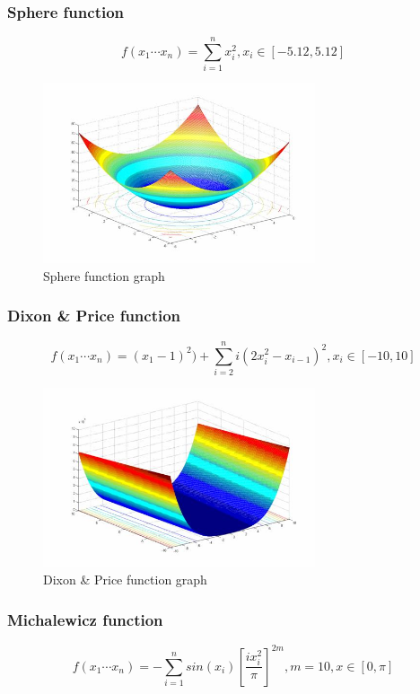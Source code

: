 \documentclass{article}
\begin{document}
	\subsubsection{Sphere function}
	$$f(x_1 \cdots x_n) = {\sum_{i=1}^{n} x_i^{2}}, x_i \in [-5.12, 5.12]$$

	\begin{figure}[!h]
		\includegraphics[height=150pt,keepaspectratio]{images/sphere-graph.jpg}
		\caption{Sphere function graph}
	\end{figure}

    
	\subsubsection{Dixon \& Price function}
	$$f(x_1 \cdots x_n) = (x_1 - 1)^2 ) + {\sum_{i=2}^{n} i(2x_i^{2} - x_{i-1})^2}, x_i \in [-10, 10]$$


	\begin{figure}[!h]
		\includegraphics[height=150pt,keepaspectratio]{images/dixon-graph.jpg}
		\caption{Dixon \& Price function graph}
	\end{figure}

	\subsubsection{Michalewicz function}
	$$f(x_1 \cdots x_n) = -{\sum_{i=1}^{n} sin(x_i)\left[\frac{ix_i^2}{\pi}\right]^{2m}}, m = 10, x \in [0, \pi]$$
\end{document}
